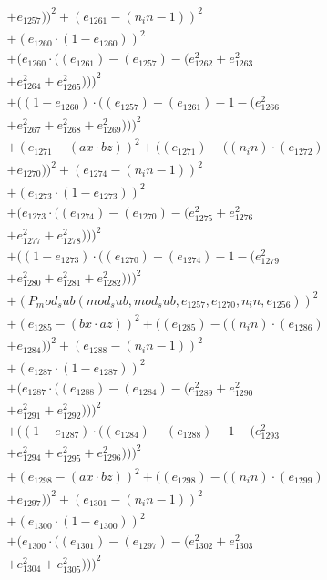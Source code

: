 \documentclass[10pt, a4paper]{article}
\begin{document}
\begin{small}
\begin{align*}
& + e_{1257}))^{2} + (e_{1261} - (n_in - 1))^{2} \\
& + (e_{1260}  \cdot  (1 - e_{1260}))^{2} \\
& + (e_{1260}  \cdot  ((e_{1261}) - (e_{1257}) - (e_{1262}^{2} + e_{1263}^{2} \\
& + e_{1264}^{2} + e_{1265}^{2})))^{2} \\
& + ((1 - e_{1260})  \cdot  ((e_{1257}) - (e_{1261}) - 1 - (e_{1266}^{2} \\
& + e_{1267}^{2} + e_{1268}^{2} + e_{1269}^{2})))^{2} \\
& + (e_{1271} - (ax  \cdot  bz))^{2} + ((e_{1271}) - ((n_in)  \cdot  (e_{1272}) \\
& + e_{1270}))^{2} + (e_{1274} - (n_in - 1))^{2} \\
& + (e_{1273}  \cdot  (1 - e_{1273}))^{2} \\
& + (e_{1273}  \cdot  ((e_{1274}) - (e_{1270}) - (e_{1275}^{2} + e_{1276}^{2} \\
& + e_{1277}^{2} + e_{1278}^{2})))^{2} \\
& + ((1 - e_{1273})  \cdot  ((e_{1270}) - (e_{1274}) - 1 - (e_{1279}^{2} \\
& + e_{1280}^{2} + e_{1281}^{2} + e_{1282}^{2})))^{2} \\
& + (P_mod_sub(mod_sub, mod_sub, e_{1257}, e_{1270}, n_in, e_{1256}))^{2} \\
& + (e_{1285} - (bx  \cdot  az))^{2} + ((e_{1285}) - ((n_in)  \cdot  (e_{1286}) \\
& + e_{1284}))^{2} + (e_{1288} - (n_in - 1))^{2} \\
& + (e_{1287}  \cdot  (1 - e_{1287}))^{2} \\
& + (e_{1287}  \cdot  ((e_{1288}) - (e_{1284}) - (e_{1289}^{2} + e_{1290}^{2} \\
& + e_{1291}^{2} + e_{1292}^{2})))^{2} \\
& + ((1 - e_{1287})  \cdot  ((e_{1284}) - (e_{1288}) - 1 - (e_{1293}^{2} \\
& + e_{1294}^{2} + e_{1295}^{2} + e_{1296}^{2})))^{2} \\
& + (e_{1298} - (ax  \cdot  bz))^{2} + ((e_{1298}) - ((n_in)  \cdot  (e_{1299}) \\
& + e_{1297}))^{2} + (e_{1301} - (n_in - 1))^{2} \\
& + (e_{1300}  \cdot  (1 - e_{1300}))^{2} \\
& + (e_{1300}  \cdot  ((e_{1301}) - (e_{1297}) - (e_{1302}^{2} + e_{1303}^{2} \\
& + e_{1304}^{2} + e_{1305}^{2})))^{2} \\

\end{align*}
\end{small}
\end{document}

